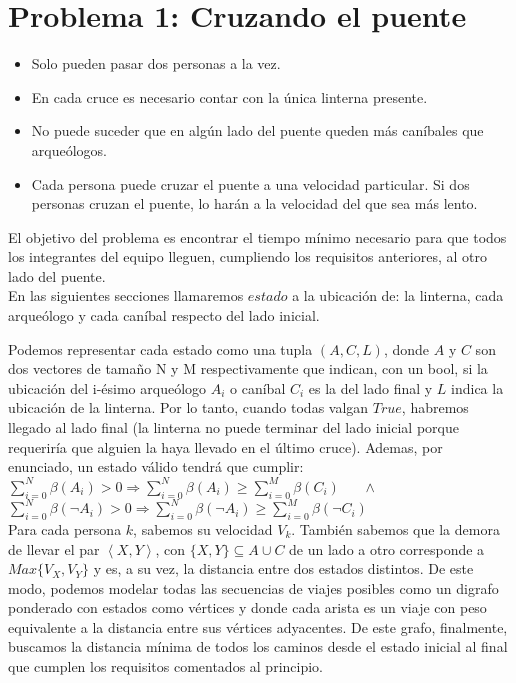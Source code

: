 \section{Problema 1: Cruzando el puente}


            \begin{itemize}
                \item Solo pueden pasar dos personas a la vez.
                \item En cada cruce es necesario contar con la única linterna presente.
                \item No puede suceder que en algún lado del puente queden más caníbales que arqueólogos.
                \item Cada persona puede cruzar el puente a una velocidad particular. Si dos personas cruzan el puente, lo harán a la velocidad del que sea más lento.
            \end{itemize}

        El objetivo del problema es encontrar el tiempo mínimo necesario para que todos los integrantes del equipo lleguen, cumpliendo los requisitos anteriores, al otro lado del puente.
        \\

        En las siguientes secciones llamaremos $estado$ a la ubicación de: la linterna, cada arqueólogo y cada caníbal respecto del lado inicial.

        Podemos representar cada estado como una tupla $(A,C,L)$, donde $A$ y $C$ son dos vectores de tamaño N y M respectivamente que indican, con un bool, si la ubicación del i-ésimo arqueólogo $A_i$ o caníbal $C_i$ es la del lado final y $L$  indica la ubicación de la linterna. Por lo tanto, cuando todas valgan $True$, habremos llegado al lado final (la linterna no puede terminar del lado inicial porque requeriría que alguien la haya llevado en el último cruce). Ademas, por enunciado, un estado válido tendrá que cumplir:
        \\

        $\sum_{i=0}^{N}\beta(A_i) > 0 \Rightarrow \sum_{i=0}^{N}\beta(A_i) \ge \sum_{i=0}^{M}\beta(C_i)  $
        \ \ \
        $\wedge$
        \ \ \
        $\sum_{i=0}^{N}\beta(\neg A_i) > 0 \Rightarrow \sum_{i=0}^{N}\beta(\neg A_i) \ge \sum_{i=0}^{M}\beta(\neg C_i)$
        \\

        Para cada persona $k$, sabemos su velocidad $V_k$. También sabemos que la demora de llevar el par $\left \langle {X, Y} \right \rangle$, con $\{X,Y\} \subseteq A \cup C$ de un lado a otro corresponde a $Max\{ V_{X}, V_{Y}  \}$ y es, a su vez, la distancia entre dos estados distintos. De este modo, podemos modelar todas las secuencias de viajes posibles como un digrafo ponderado con estados como vértices y donde cada arista es un viaje con peso equivalente a la distancia entre sus vértices adyacentes. De este grafo, finalmente, buscamos la distancia mínima de todos los caminos desde el estado inicial al final que cumplen los requisitos comentados al principio.
        \\

